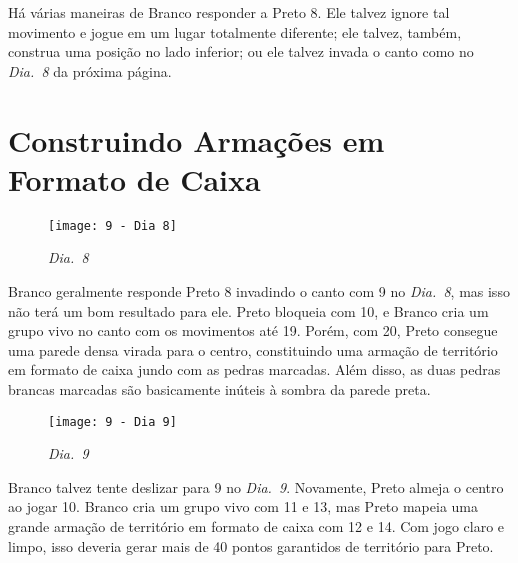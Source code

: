 Há várias maneiras de Branco responder a Preto 8. Ele talvez ignore tal movimento e jogue em um lugar totalmente diferente; ele talvez, também, construa uma posição no lado inferior; ou ele talvez invada o canto como no \emph{Dia.\@~8} da próxima página.

\pagebreak

\section{Construindo Armações em Formato de Caixa}

\begin{wrapfigure}{r}{60mm}
    \vspace{-27.5pt}
    \begin{center}
        \texttt{[image: 9 - Dia 8]}
        \captionsetup{justification=centering}
        \caption*{\emph{Dia.\@~8}}
    \end{center}
    \vspace{-32.5pt}
\end{wrapfigure}

Branco geralmente responde Preto 8 invadindo o canto com 9 no \emph{Dia.\@~8}, mas isso não terá um bom resultado para ele. Preto bloqueia com 10, e Branco cria um grupo vivo no canto com os movimentos até 19. Porém, com 20, Preto consegue uma parede densa virada para o centro, constituindo uma armação de território em formato de caixa jundo com as pedras marcadas. Além disso, as duas pedras brancas marcadas são basicamente inúteis à sombra da parede preta.

\begin{wrapfigure}{l}{60mm}
    \vspace{-27.5pt}
    \begin{center}
        \texttt{[image: 9 - Dia 9]}
        \captionsetup{justification=centering}
        \caption*{\emph{Dia.\@~9}}
    \end{center}
    \vspace{-80pt}
\end{wrapfigure}

\bigskip

Branco talvez tente deslizar  para 9 no \emph{Dia.\@~9}. Novamente, Preto almeja o centro ao jogar 10. Branco cria um grupo vivo com 11 e 13, mas Preto mapeia uma grande armação de território em formato de caixa com 12 e 14. Com jogo claro e limpo, isso deveria gerar mais de 40 pontos garantidos de território para Preto.

\pagebreak

